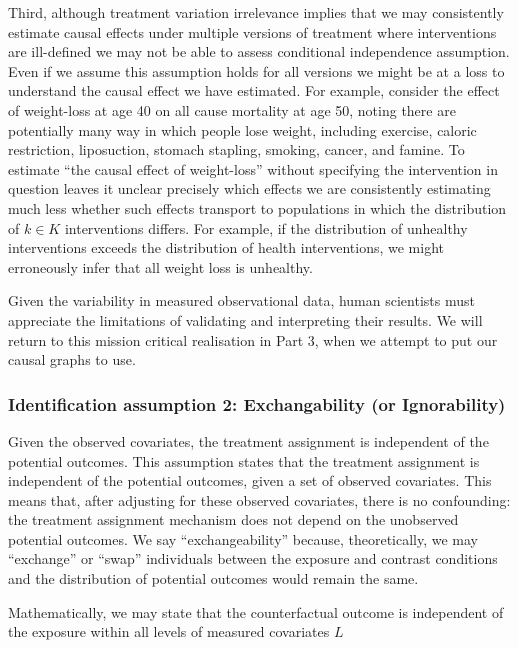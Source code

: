 \documentclass[
  singlecolumn]{report}
\begin{document}
Third, although treatment variation irrelevance implies that we may
consistently estimate causal effects under multiple versions of
treatment where interventions are ill-defined we may not be able to
assess conditional independence assumption. Even if we assume this
assumption holds for all versions we might be at a loss to understand
the causal effect we have estimated. For example, consider the effect of
weight-loss at age 40 on all cause mortality at age 50, noting there are
potentially many way in which people lose weight, including exercise,
caloric restriction, liposuction, stomach stapling, smoking, cancer, and
famine. To estimate ``the causal effect of weight-loss'' without
specifying the intervention in question leaves it unclear precisely
which effects we are consistently estimating much less whether such
effects transport to populations in which the distribution of
\(k \in K\) interventions differs. For example, if the distribution of
unhealthy interventions exceeds the distribution of health
interventions, we might erroneously infer that all weight loss is
unhealthy.

Given the variability in measured observational data, human scientists
must appreciate the limitations of validating and interpreting their
results. We will return to this mission critical realisation in Part 3,
when we attempt to put our causal graphs to use.

\hypertarget{identification-assumption-2-exchangability-or-ignorability}{%
\subsubsection{Identification assumption 2: Exchangability (or
Ignorability)}\label{identification-assumption-2-exchangability-or-ignorability}}

Given the observed covariates, the treatment assignment is independent
of the potential outcomes. This assumption states that the treatment
assignment is independent of the potential outcomes, given a set of
observed covariates. This means that, after adjusting for these observed
covariates, there is no confounding: the treatment assignment mechanism
does not depend on the unobserved potential outcomes. We say
``exchangeability'' because, theoretically, we may ``exchange'' or
``swap'' individuals between the exposure and contrast conditions and
the distribution of potential outcomes would remain the same.

Mathematically, we may state that the counterfactual outcome is
independent of the exposure within all levels of measured covariates
\(L\)
\end{document}
